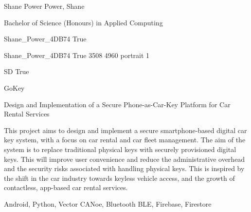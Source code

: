 
\begingroup{}\relax



\def\Key{Shane_Power_4DB74}

{Shane Power}
{Power, Shane}

{Bachelor of Science (Honours) in Applied Computing}

{Shane_Power_4DB74}
{True}

{Shane_Power_4DB74}
{True}
{3508}
{4960}
{portrait}
{1}

{SD}
{True}

{GoKey}

{Design and Implementation of a Secure Phone-as-Car-Key Platform for Car Rental Services}

{This project aims to design and implement a secure smartphone-based digital car key system, with a focus on car rental and car fleet management. The aim of the system is to replace traditional physical keys with securely provisioned digital keys. This will improve user convenience and reduce the administrative overhead and the security risks associated with handling physical keys. This is inspired by the shift in the car industry towards keyless vehicle access, and the growth of contactless, app-based car rental services.}

{Android, Python, Vector CANoe, Bluetooth BLE, Firebase, Firestore}

